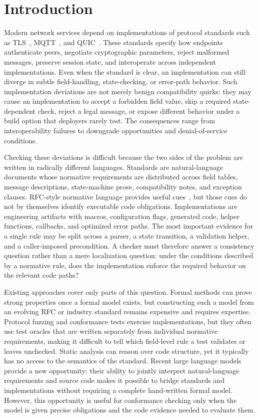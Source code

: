 \section{Introduction}

Modern network services depend on implementations of protocol standards such as
TLS~\cite{rfc8446}, MQTT~\cite{mqtt311,mqtt5}, and
QUIC~\cite{rfc9000,rfc9001,rfc9002}. These standards specify how endpoints
authenticate peers, negotiate cryptographic parameters, reject malformed
messages, preserve session state, and interoperate across independent
implementations. Even when
the standard is clear, an implementation can still diverge in subtle
field-handling, state-checking, or error-path behavior. Such implementation
deviations are not merely benign compatibility quirks: they may cause an
implementation to accept a forbidden field value, skip a required
state-dependent check, reject a legal message, or expose different behavior
under a build option that deployers rarely test. The consequences range from
interoperability failures to downgrade opportunities and denial-of-service
conditions.

Checking these deviations is difficult because the two sides of the problem are
written in radically different languages. Standards are natural-language
documents whose normative requirements are distributed across field tables,
message descriptions, state-machine prose, compatibility notes, and exception
clauses. RFC-style normative language provides useful cues~\cite{rfc2119,rfc8174}, but
those cues do not by themselves identify executable code obligations.
Implementations are engineering artifacts with macros, configuration
flags, generated code, helper functions, callbacks, and optimized error paths.
The most important evidence for a single rule may be split across a parser, a
state transition, a validation helper, and a caller-imposed precondition. A
checker must therefore answer a consistency question rather than a mere
localization question: under the conditions described by a normative rule, does
the implementation enforce the required behavior on the relevant code paths?

Existing approaches cover only parts of this question. Formal methods can prove
strong properties once a formal model exists, but constructing such a model from
an evolving RFC or industry standard remains expensive and requires expertise.
Protocol fuzzing and conformance tests exercise implementations, but they often
use test oracles that are written separately from individual normative
requirements, making it difficult to tell which field-level rule a test
validates or leaves unchecked.
Static analysis can reason over code structure, yet it typically has no access
to the semantics of the standard. Recent large language models provide a new
opportunity: their ability to jointly interpret natural-language requirements
and source code makes it possible to bridge standards and implementations
without requiring a complete hand-written formal model. However, this
opportunity is useful for conformance checking only when the model is given
precise obligations and the code evidence needed to evaluate them.

